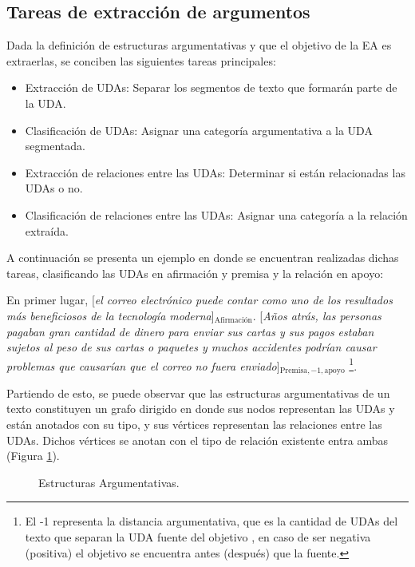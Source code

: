 \documentclass[a4paper,11pt,twocolumn,twoside]{article}
\begin{document}
\subsection{Tareas de extracción de argumentos}

Dada la definición de estructuras argumentativas y que el objetivo de la EA es extraerlas,
se conciben las siguientes tareas principales:

\begin{itemize}
	\item Extracción de UDAs: Separar los segmentos de texto que formarán parte de la UDA.
	\item Clasificación de UDAs: Asignar una categoría argumentativa a la UDA segmentada.
	\item Extracción de relaciones entre las UDAs: Determinar si están relacionadas las UDAs o no.
	\item Clasificación de relaciones entre las UDAs: Asignar una categoría a la relación extraída.
\end{itemize}

A continuación se presenta un ejemplo en donde se encuentran realizadas dichas tareas, clasificando
las UDAs en afirmación y premisa y la relación en apoyo:

\begin{adjustwidth}{25pt}{25pt}
	En primer lugar, [\textit{el correo electrónico puede contar como uno de los resultados
	más beneficiosos de la tecnología moderna}]$_{\mathrm{\text{Afirmación}}}$. [\textit{Años atrás, las personas pagaban gran cantidad de dinero para
	enviar sus cartas y sus pagos estaban sujetos al peso de sus cartas o paquetes y muchos accidentes podrían 
	causar problemas que causarían que el correo no fuera enviado}]$_{\mathrm{Premisa, -1, apoyo}}$
	\footnote{El -1 representa la distancia argumentativa, que es la cantidad de UDAs del texto que separan la 
	UDA fuente del objetivo \cite{galassi2021deep}, en caso de ser negativa (positiva) el objetivo se encuentra 
	antes (después) que la fuente.}.
\end{adjustwidth}

Partiendo de esto, se puede observar que las estructuras argumentativas de un texto constituyen un grafo dirigido 
en donde sus nodos representan las UDAs y están anotados con su tipo, y sus vértices representan las 
relaciones entre las UDAs. Dichos vértices se anotan con el tipo de relación existente entra ambas 
(Figura \ref{fig:arg_struct}).

\begin{figure}[h]
	\centering
	
	\caption{Estructuras Argumentativas.}
	\label{fig:arg_struct}
\end{figure}
\end{document}
